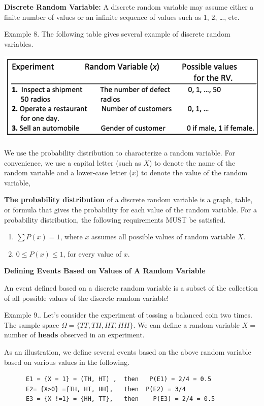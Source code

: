 \documentclass[
]{book}
\begin{document}
\textbf{Discrete Random Variable:} A discrete random variable may assume either a finite number of values or an infinite sequence of values such as 1, 2, \ldots, etc.

Example 8. The following table gives several example of discrete random variables.

\begin{center}\includegraphics[width=0.6\linewidth]{week03/discreteRV} \end{center}

We use the probability distribution to characterize a random variable. For convenience, we use a capital letter (such as \(X\)) to denote the name of the random variable and a lower-case letter (\(x\)) to denote the value of the random variable,

\textbf{The probability distribution} of a discrete random variable is a graph, table, or formula that gives the probability for each value of the random variable. For a probability distribution, the following requirements MUST be satisfied.

\begin{enumerate}
\def\labelenumi{\arabic{enumi}.}
\item
  \(\sum P(x) = 1\), where \(x\) assumes all possible values of random variable \(X\).
\item
  \(0 \le P(x) \le 1\), for every value of \(x\).
\end{enumerate}

\textbf{Defining Events Based on Values of A Random Variable}

An event defined based on a discrete random variable is a subset of the collection of all possible values of the discrete random variable!

\hfill\break

Example 9.. Let's consider the experiment of tossing a balanced coin two times. The sample space \(\Omega = \{ TT, TH, HT, HH \}\). We can define a random variable \(X=\) number of \textbf{heads} observed in an experiment.

As an illustration, we define several events based on the above random variable based on various values in the following.

\begin{verbatim}
      E1 = {X = 1} = (TH, HT) ,  then   P(E1) = 2/4 = 0.5
      E2= {X>0} ={TH, HT, HH},   then  P(E2) = 3/4
      E3 = {X !=1} = {HH, TT},   then    P(E3) = 2/4 = 0.5
\end{verbatim}
\end{document}

